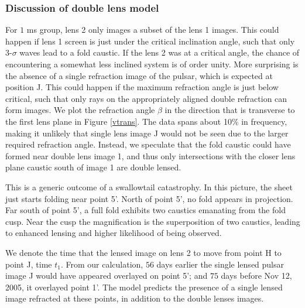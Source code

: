 \documentclass[useAMS,usenatbib]{mn2e}
\begin{document}

\subsubsection{Discussion of double lens model}
For $1$ ms group, lens 2
only images a subset of the lens 1 images.  This could happen if
lens 1 screen is just under the critical inclination
angle, such that only 3-$\sigma$ waves lead to a fold caustic.  If the lens 2 was at a critical angle, the chance of encountering a
somewhat less inclined system is of order unity.
More surprising is the absence of a single refraction
image of the pulsar, which is expected at position J.  This could
happen if the maximum refraction angle is just below critical, such
that only rays on the appropriately aligned double refraction can form
images.  
We plot the refraction angle $\beta$ in the
direction that is transverse to the first lens plane in Figure
\ref{vtrans}. The data
spans about 10\% in frequency, making it unlikely that single lens
image J would not be seen due to the larger required refraction
angle.  Instead, we speculate that the fold caustic could have formed
near double lens image 1, and thus only intersections with the closer
lens plane caustic south of image 1 are double lensed.

This is a generic outcome of a swallowtail
catastrophy\citep{Arnold1990}.   In this picture, the sheet just
starts folding near point 5'.  North of point 5', no fold appears in
projection.  Far south of point 5', a full fold exhibits two caustics
emanating from the fold cusp.  Near the cusp the magnification is the
superposition of two caustics, leading to enhanced lensing and higher
likelihood of being observed.  

We denote the time that the lensed image on lens 2 to move from point
H to point J, time $t_1$. From our calculation, $56$ days earlier the
single lensed pulsar image  J would have appeared overlayed on point
5'; and $75$ days 
before Nov 12, 2005, it overlayed point 1'. The
model predicts the presence of a single lensed image refracted at
these points, in addition to the double lenses images.
\end{document}
